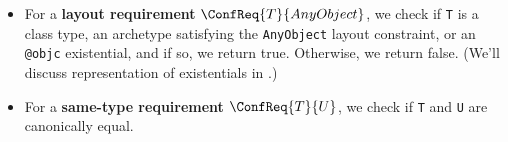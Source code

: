 \documentclass[../generics]{subfiles}
\begin{document}
\begin{algorithm}
\begin{itemize}
\begin{enumerate}
\end{enumerate}
\item For a \textbf{layout requirement} $\ConfReq{T}{AnyObject}$, we check if \texttt{T} is a class type, an archetype satisfying the \texttt{AnyObject} layout constraint, or an \texttt{@objc} existential, and if so, we return true. Otherwise, we return false. (We'll discuss representation of existentials in .)
\item For a \textbf{same-type requirement} $\ConfReq{T}{U}$, we check if \texttt{T} and \texttt{U} are canonically equal.
\end{itemize}
\end{algorithm}
\end{document}
